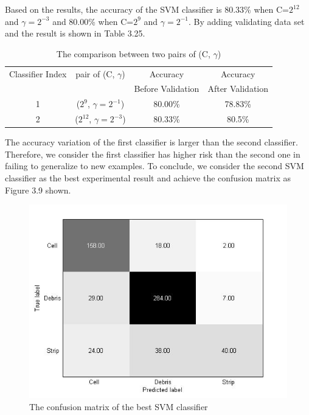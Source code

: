 Based on the results, the accuracy of the SVM classifier is 80.33\% when C=$2^{12}$ and $\gamma = 2^{-3}$ and 80.00\% when C=$2^{9}$ and $\gamma = 2^{-1}$. By adding validating data set and the result is shown in Table 3.25. 
\begin{table}[!h]
\begin{center}
\renewcommand{\arraystretch}{0.8}
\begin{tabular}{|| c | c | c | c ||}
\hline
 Classifier Index & pair of (C, $\gamma$) & Accuracy & Accuracy \\
 & & Before Validation & After Validation \\
\hline
 1 & ($2^{9}$, $\gamma = 2^{-1}$) & 80.00\% & 78.83\% \\
 2 & ($2^{12}$, $\gamma = 2^{-3}$) & 80.33\% & 80.5\% \\
\hline 
\end{tabular}
\end{center}
\caption{The comparison between two pairs of (C, $\gamma$)}
\end{table}
The accuracy variation of the first classifier is larger than the second classifier. Therefore, we consider the first classifier has higher risk than the second one in failing to generalize to new examples. To conclude, we consider the second SVM classifier as the best experimental result and achieve the confusion matrix as Figure 3.9 shown. 
\begin{figure}[!b]
\includegraphics[width=\linewidth]{fig3_9}
\caption{The confusion matrix of the best SVM classifier}
\end{figure}
